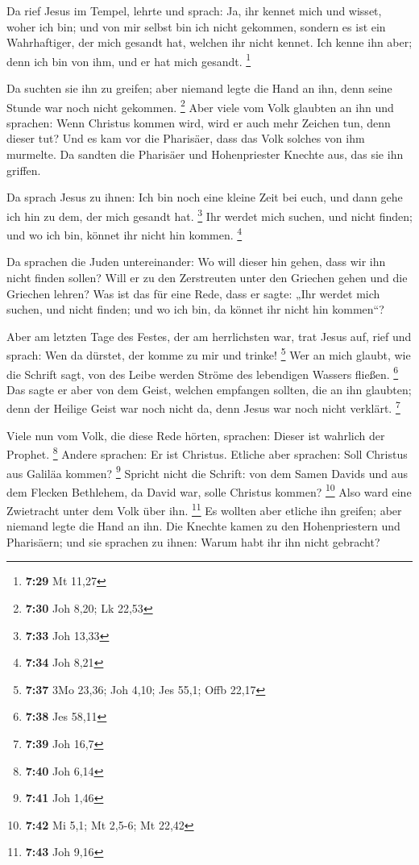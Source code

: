  Da rief Jesus im Tempel, lehrte und sprach: Ja, ihr
kennet mich und wisset, woher ich bin; und von mir selbst bin ich nicht
gekommen, sondern es ist ein Wahrhaftiger, der mich gesandt hat, welchen
ihr nicht kennet.  Ich kenne ihn aber; denn ich bin von
ihm, und er hat mich gesandt. \footnote{\textbf{7:29} Mt 11,27}

 Da suchten sie ihn zu greifen; aber niemand legte die
Hand an ihn, denn seine Stunde war noch nicht gekommen. \footnote{\textbf{7:30}
  Joh 8,20; Lk 22,53}  Aber viele vom Volk glaubten an
ihn und sprachen: Wenn Christus kommen wird, wird er auch mehr Zeichen
tun, denn dieser tut?  Und es kam vor die Pharisäer, dass
das Volk solches von ihm murmelte. Da sandten die Pharisäer und
Hohenpriester Knechte aus, das sie ihn griffen.

 Da sprach Jesus zu ihnen: Ich bin noch eine kleine Zeit
bei euch, und dann gehe ich hin zu dem, der mich gesandt hat.
\footnote{\textbf{7:33} Joh 13,33}  Ihr werdet mich
suchen, und nicht finden; und wo ich bin, könnet ihr nicht hin kommen.
\footnote{\textbf{7:34} Joh 8,21}

 Da sprachen die Juden untereinander: Wo will dieser hin
gehen, dass wir ihn nicht finden sollen? Will er zu den Zerstreuten
unter den Griechen gehen und die Griechen lehren?  Was
ist das für eine Rede, dass er sagte: „Ihr werdet mich suchen, und nicht
finden; und wo ich bin, da könnet ihr nicht hin kommen``?

 Aber am letzten Tage des Festes, der am herrlichsten
war, trat Jesus auf, rief und sprach: Wen da dürstet, der komme zu mir
und trinke! \footnote{\textbf{7:37} 3Mo 23,36; Joh 4,10; Jes 55,1; Offb
  22,17}  Wer an mich glaubt, wie die Schrift sagt, von
des Leibe werden Ströme des lebendigen Wassers fließen. \footnote{\textbf{7:38}
  Jes 58,11}  Das sagte er aber von dem Geist, welchen
empfangen sollten, die an ihn glaubten; denn der Heilige Geist war noch
nicht da, denn Jesus war noch nicht verklärt. \footnote{\textbf{7:39}
  Joh 16,7}

 Viele nun vom Volk, die diese Rede hörten, sprachen:
Dieser ist wahrlich der Prophet. \footnote{\textbf{7:40} Joh 6,14}
 Andere sprachen: Er ist Christus. Etliche aber sprachen:
Soll Christus aus Galiläa kommen? \footnote{\textbf{7:41} Joh 1,46}
 Spricht nicht die Schrift: von dem Samen Davids und aus
dem Flecken Bethlehem, da David war, solle Christus kommen? \footnote{\textbf{7:42}
  Mi 5,1; Mt 2,5-6; Mt 22,42}  Also ward eine Zwietracht
unter dem Volk über ihn. \footnote{\textbf{7:43} Joh 9,16}
 Es wollten aber etliche ihn greifen; aber niemand legte
die Hand an ihn.  Die Knechte kamen zu den Hohenpriestern
und Pharisäern; und sie sprachen zu ihnen: Warum habt ihr ihn nicht
gebracht?

